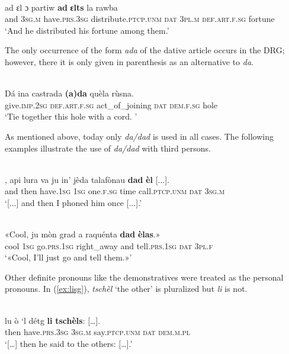 \ea
{}\\
\gll ad ɛl ɔ partiw \textbf{ad} \textbf{ɛlts} la rawba\\
     and \textsc{3sg.m} have.\textsc{prs.3sg} distribute.\textsc{ptcp.unm} \textsc{dat} \textsc{3pl.m} \textsc{def.art.f.sg} fortune\\
\glt `And he distributed his fortune among them.'
\z

The only occurrence of the form \textit{ada} of the dative article occurs in the DRG; however, there it is only given in parenthesis as an alternative to \textit{da}.

\ea
{}\\
\gll  Dá ina castrada \textbf{(a)da} quèla rùsna.\\
     give.\textsc{imp.2sg} \textsc{def.art.f.sg} act\_of\_joining \textsc{dat} \textsc{dem.f.sg} hole\\
\glt `Tie together this hole with a cord. '
\z

As mentioned above, today only \textit{da/dad} is used in all cases. The following examples illustrate the use of \textit{da/dad} with third persons.

\ea

\\ 
\gll  [...], api lura va ju in’ jèda talafònau \textbf{dad} \textbf{èl} [...].\\
{} and then have.\textsc{1sg}  \textsc{1sg} one.\textsc{f.sg} time call.\textsc{ptcp.unm} \textsc{dat} \textsc{3sg.m}\\
\glt `[...] and then I phoned him once [...].'
\z

\ea

\\
\gll  «Cool, ju mòn grad a raquénta \textbf{dad} \textbf{èlas}.»\\
cool \textsc{1sg}  go.\textsc{prs.1sg} right\_away and tell.\textsc{prs.1sg} \textsc{dat} \textsc{3pl.f} \\
\glt `«Cool, I’ll just go and tell them.»'
\z

Other definite pronouns like the demonstratives were treated as the personal pronouns. In (\ref{ex:lisg}), \textit{tschèl} `the other' is pluralized but \textit{li} is not.

\ea\label{ex:lisg}
\\
\gll  […] lu ò ‘l détg \textbf{li} \textbf{tschèls}: […].\\
{} then have.\textsc{prs.3sg} \textsc{3sg.m} say.\textsc{ptcp.unm} \textsc{dat} \textsc{dem.m.pl}\\
\glt `[…] then he said to the others: […].'
\z


